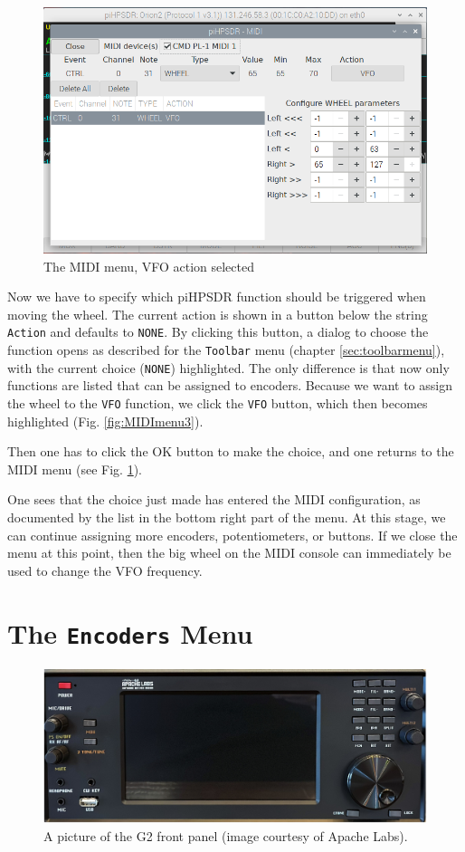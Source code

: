 \documentclass[12pt]{book}
\def\rett#1{\texttt{\color{red}#1}}
\def\bltt#1{\texttt{\color{blue}#1}}
\def\pH{pi\-HPSDR }
\begin{document}
\begin{figure}[ht!]
\center
\includegraphics[width=12cm]{MIDImenu4.png}
\caption{The MIDI menu, VFO action selected}
\label{fig:MIDImenu4}
\end{figure}
Now we have to specify which \pH function should be triggered when moving the wheel.
The current action is shown in a button below the string \rett{Action} and defaults to \bltt{NONE}.
By clicking this button, a dialog to choose the function opens as described for the
\bltt{Toolbar} menu (chapter \ref{sec:toolbarmenu}), with the current choice (\bltt{NONE})
highlighted. The only difference is that now only functions are listed that can be
assigned to encoders.
Because we want to assign the wheel to the \bltt{VFO} function, we click
the \bltt{VFO} button, which then becomes highlighted (Fig. \ref{fig:MIDImenu3}).



 Then one has to click the OK button to make the choice, and one returns to the
 MIDI menu (see Fig. \ref{fig:MIDImenu4}).

One sees that the choice just made has entered the MIDI configuration, as documented by the
list in the bottom right part of the menu. At this stage, we can continue
assigning more encoders, potentiometers, or buttons. If we close the menu at
this point, then the big wheel on the MIDI console can immediately be used
to change the VFO frequency.

\section{The \texttt{Encoders} Menu}
\begin{figure}[ht!]
\center
\includegraphics[width=12cm]{g2_frontpanel.png}
\caption{A picture of the G2 front panel (image courtesy of Apache Labs).}
\label{fig:g2_frontpanel}
\end{figure}
\end{document}
